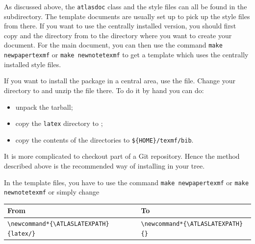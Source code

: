 As discussed above, the \texttt{atlasdoc} class and the style files can all be found in the 
 subdirectory. The template documents are usually set up to pick up the style files from there.
If you want to use the centrally installed version,
you should first copy  and the  directory from 
 to the directory where you want to create your document.
For the main document, you can then use the command 
\texttt{make newpapertexmf} or \texttt{make newnotetexmf} to get a template which uses the
centrally installed style files.

If you want to install the package in a central area, use the  file.
Change your directory to  and unzip the file there. To do it by hand you can do:
\begin{itemize}
\item unpack the tarball;
\item copy the \texttt{latex} directory to ;
\item copy the contents of the  directories 
  to \texttt{\$\{HOME\}/texmf/bib}.
\end{itemize}
It is more complicated to checkout part of a Git repository.
Hence the method described above is the recommended way of installing
 in your  tree.


In the template files, you have to use the command
\texttt{make newpapertexmf} or \texttt{make newnotetexmf} or simply change
\begin{center}
  \begin{tabular}{ll}
    From & To \\
    \midrule
    \verb|\newcommand*{\ATLASLATEXPATH}{latex/}|    & \verb|\newcommand*{\ATLASLATEXPATH}{}| \\
  \end{tabular}
\end{center}

